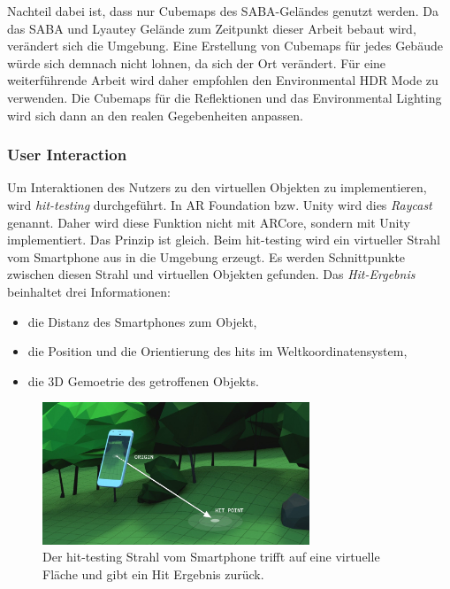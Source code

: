 Nachteil dabei ist, dass nur Cubemaps des SABA-Geländes genutzt werden. Da das SABA und Lyautey Gelände zum Zeitpunkt dieser Arbeit bebaut wird, verändert sich die Umgebung. Eine Erstellung von Cubemaps für jedes Gebäude würde sich demnach nicht lohnen, da sich der Ort verändert. Für eine weiterführende Arbeit wird daher empfohlen den Environmental HDR Mode zu verwenden. Die Cubemaps für die Reflektionen und das Environmental Lighting wird sich dann an den realen Gegebenheiten anpassen.

\subsubsection{User Interaction}
\label{technische-umsetzung-arcore-user-interaction}
Um Interaktionen des Nutzers zu den virtuellen Objekten zu implementieren, wird \textit{hit-testing} durchgeführt. In AR Foundation bzw. Unity wird dies \textit{Raycast} genannt. Daher wird diese Funktion nicht mit ARCore, sondern mit Unity implementiert. Das Prinzip ist gleich. Beim hit-testing wird ein virtueller Strahl vom Smartphone aus in die Umgebung erzeugt. Es werden Schnittpunkte zwischen diesen Strahl und virtuellen Objekten gefunden. Das \textit{Hit-Ergebnis} beinhaltet drei Informationen:

\begin{itemize}
    \item die Distanz des Smartphones zum Objekt, 
    \item die Position und die Orientierung des hits im Weltkoordinatensystem,
    \item die 3D Gemoetrie des getroffenen Objekts.
\end{itemize}

\begin{figure}[h]
    \centering
    \includegraphics[width=8cm]{img/anwendung/arcore/hit-test-explainer.jpeg}
    \caption[Der hit-testing Strahl vom Smartphone trifft auf eine virtuelle Fläche und gibt ein Hit Ergebnis zurück.]{Der hit-testing Strahl vom Smartphone trifft auf eine virtuelle Fläche und gibt ein Hit Ergebnis zurück.\protect\footnotemark}
    \label{fig:anwendung-arcore-hit-test}
\end{figure}

